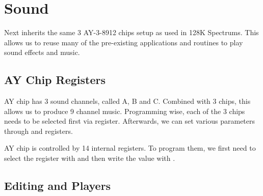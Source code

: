 \section{Sound}
\label{zx_next_sound}


Next inherits the same 3 AY-3-8912 chips setup as used in 128K Spectrums. This allows us to reuse many of the pre-existing applications and routines to play sound effects and music.

\subsection{AY Chip Registers}

AY chip has 3 sound channels, called A, B and C. Combined with 3 chips, this allows us to produce 9 channel music. Programming wise, each of the 3 chips needs to be selected first via  register. Afterwards, we can set various parameters through  and  registers.

AY chip is controlled by 14 internal registers. To program them, we first need to select the register with  and then write the value with .


\subsection{Editing and Players}


